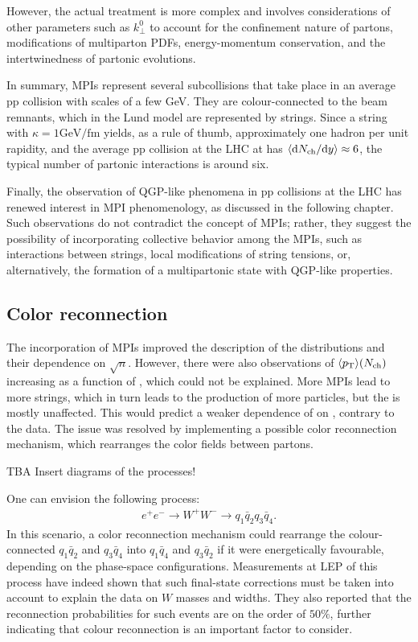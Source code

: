 However, the actual treatment is more complex and involves considerations of other parameters such as $k_\perp^0$ to account for the confinement nature of partons, modifications of multiparton PDFs, energy-momentum conservation, and the intertwinedness of partonic evolutions.



In summary, MPIs represent several subcollisions that take place in an average pp collision with \pt scales of a few GeV. They are colour-connected to the beam remnants, which in the Lund model are represented by strings. Since a string with $\kappa = 1 \mathrm{GeV} /\mathrm{fm}$ yields, as a rule of thumb, approximately one hadron per unit rapidity, and the average pp collision at the LHC at  has $\langle \mathrm{d}N_\mathrm{ch}/\mathrm{d}y \rangle \approx 6$, the typical number of partonic interactions is around six.

Finally, the observation of QGP-like phenomena in pp collisions at the LHC has renewed interest in MPI phenomenology, as discussed in the following chapter. Such observations do not contradict the concept of MPIs; rather, they suggest the possibility of incorporating collective behavior among the MPIs, such as interactions between strings, local modifications of string tensions, or, alternatively, the formation of a multipartonic state with QGP-like properties.

\subsection{Color reconnection}

The incorporation of MPIs improved the description of the \Nch distributions and their dependence on $\sqrt{n}$. However, there were also observations of $\langle p_{\text{T}} \rangle(N_{\text{ch}})$ increasing as a function of \Nch, which could not be explained. More MPIs lead to more strings, which in turn leads to the production of more particles, but the \pt is mostly unaffected. This would predict a weaker dependence of \meanpt on \Nch, contrary to the data. The issue was resolved by implementing a possible color reconnection mechanism, which rearranges the color fields between partons.

TBA Insert diagrams of the processes!

One can envision the following process:
\begin{align*}
e^+ e^- \rightarrow W^+ W^- \rightarrow q_1\bar{q}_2 q_3\bar{q}_4  .
\end{align*}
In this scenario, a color reconnection mechanism could rearrange the colour-connected $q_1\bar{q}_2$ and $q_3\bar{q}_4$ into $q_1\bar{q}_4$ and $q_3\bar{q}_2$ if it were energetically favourable, depending on the phase-space configurations. Measurements at LEP of this process have indeed shown that such final-state corrections must be taken into account to explain the data on $W$ masses and widths. They also reported that the reconnection probabilities for such events are on the order of $50\%$, further indicating that colour reconnection is an important factor to consider.


